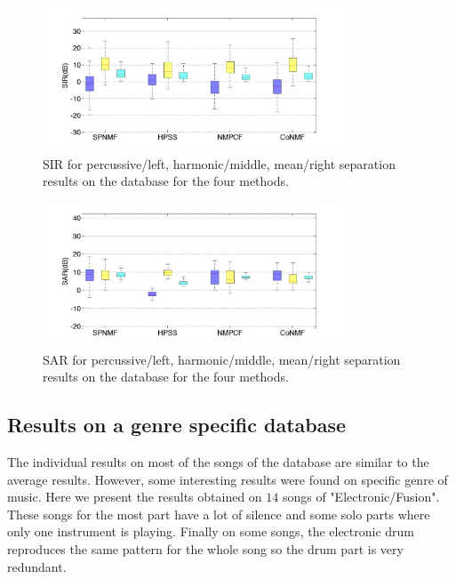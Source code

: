 \documentclass[journal]{IEEEtran}
\begin{document}
\begin{figure}[h]

  \centering 
  \includegraphics[width=9cm]{fig/DatabaseSIR.png}
  \caption{\label{DatabaseSIR} SIR for percussive/left, harmonic/middle, mean/right separation results on the database for the four methods.}
  
\end{figure}

\begin{figure}[h]

  \centering 
  \includegraphics[width=9cm]{fig/DatabaseSAR.png}
  \caption{\label{DatabaseSAR} SAR for percussive/left, harmonic/middle, mean/right separation results on the database for the four methods.}
  
\end{figure}




\subsection{Results on a genre specific database}\label{sec:subdata}

The individual results on most of the songs of the database are similar to the average results. However, some interesting results were found on specific genre of music. Here we present the results obtained on $14$ songs of "Electronic/Fusion". These songs for the most part have a lot of silence and some solo parts where only one instrument is playing. Finally on some songs, the electronic drum reproduces the same pattern for the whole song so the drum part is very redundant.
\end{document}
